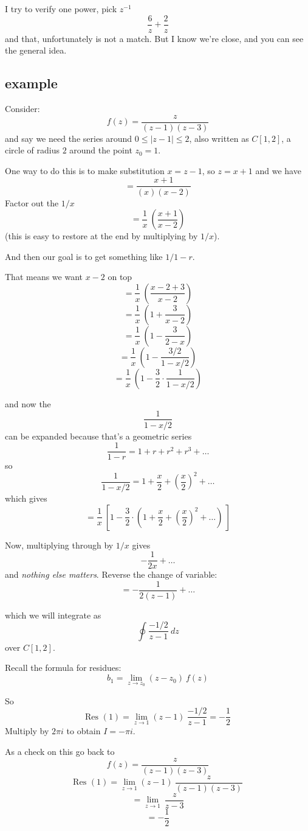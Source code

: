 \documentclass[11pt, oneside]{article}
\begin{document}
I try to verify one power, pick $z^{-1}$  
\[ \frac{6}{z} + \frac{2}{z} \]
and that, unfortunately is not a match.  But I know we're close, and you can see the general idea.

\subsection*{example}

Consider:
\[ f(z) = \frac{z}{(z-1)(z-3)} \]
and say we need the series around $0 \le | z - 1 | \le 2$, also written as $C[1,2]$, a circle of radius $2$ around the point $z_0 = 1$.

One way to do this is to make substitution $x = z - 1$, so $z = x + 1$ and we have
\[  = \frac{x+1}{(x)(x-2)} \]
Factor out the $1/x$
\[ = \frac{1}{x} \ ( \frac{x+1}{x-2} ) \]
(this is easy to restore at the end by multiplying by $1/x$).

And then our goal is to get something like $1/1-r$.  

That means we want $x - 2$ on top
\[ = \frac{1}{x} \ ( \frac{x - 2 +  3}{x - 2} ) \]
\[ = \frac{1}{x} \ ( 1 + \frac{ 3}{x-2} ) \]
\[ = \frac{1}{x} \ ( 1 - \frac{ 3}{2-x} ) \]
\[ = \frac{1}{x} \ ( 1 - \frac{ 3/2}{1 - x/2} ) \]
\[ = \frac{1}{x} \ ( 1 - \frac{3}{2} \cdot \frac{1}{1 - x/2} ) \]

and now the 
\[ \frac{1}{1 - x/2} \]
can be expanded because that's a geometric series
\[ \frac{1}{1 - r} = 1 + r + r^2 + r^3 + \dots \]
so 
\[ \frac{1}{1 - x/2} = 1 + \frac{x}{2} + (\frac{x}{2} )^2 + \dots \]
which gives
\[ = \frac{1}{x} \ [ 1 - \frac{3}{2} \cdot (1 + \frac{x}{2} + (\frac{x}{2} )^2 + \dots) \ ] \]

Now, multiplying through by $1/x$ gives
\[ -\frac{1}{2x} + \dots \]
and \emph{nothing else matters}.  Reverse the change of variable:
\[ = -\frac{1}{2(z-1)} + \dots \]

which we will integrate as
\[ \oint \frac{-1/2}{z-1} \ dz \]
 over $C[1,2]$.
 
Recall the formula for residues:
\[ b_1 = \lim_{z \rightarrow z_0} (z-z_0) \ f(z)  \]

So
\[ \text{Res }(1) = \lim_{z \rightarrow 1} (z-1) \ \frac{-1/2}{z-1} = -\frac{1}{2} \]
Multiply by $2 \pi i$ to obtain $I = -\pi i$.

As a check on this go back to 
\[ f(z) = \frac{z}{(z-1)(z-3)} \]
\[ \text{Res }(1) = \lim_{z \rightarrow 1} (z-1) \ \frac{z}{(z-1)(z-3)} \]
\[ =  \lim_{z \rightarrow 1} \ \frac{z}{z-3} \]
\[ = -\frac{1}{2} \]
\end{document}
